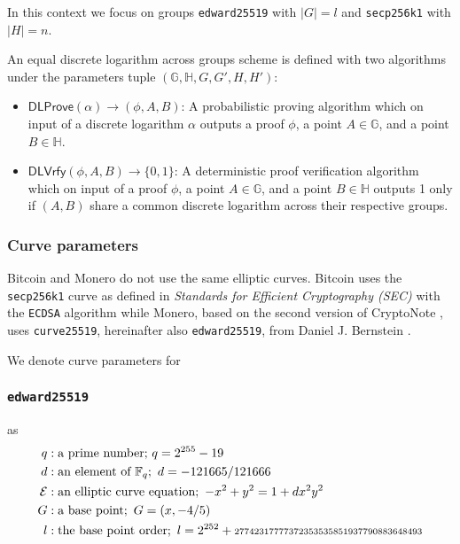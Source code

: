 \documentclass{llncs}
\newcommand{\DLProve}{\textsf{DLProve}}
\newcommand{\DLVrfy}{\textsf{DLVrfy}}
\newcommand{\GG}{\mathbb{G}}
\newcommand{\HH}{\mathbb{H}}
\begin{document}
In this context we focus on groups \texttt{edward25519} with $|G| = l$ and \texttt{secp256k1} with $|H| = n$.

\begin{definition}
    An equal discrete logarithm across groups scheme is defined with two algorithms under the parameters tuple $(\GG,\HH,G,G',H,H')$:
\begin{itemize}
    \item $\DLProve(\alpha) \rightarrow (\phi,A,B)$: A probabilistic proving algorithm which on input of a discrete logarithm $\alpha$ outputs a proof $\phi$, a point $A \in \GG$, and a point $B \in \HH$.
    \item $\DLVrfy(\phi,A,B) \rightarrow \{0,1\}$: A deterministic proof verification algorithm which on input of a proof $\phi$, a point $A \in \GG$, and a point $B \in \HH$ outputs 1 only if $(A,B)$ share a common discrete logarithm across their respective groups.
\end{itemize}
\end{definition}

\subsubsection{Curve parameters}
\label{curveParams}
Bitcoin and Monero do not use the same elliptic curves. Bitcoin uses the \texttt{secp256k1} curve as defined in \textit{Standards for Efficient Cryptography (SEC)} with the \texttt{ECDSA} algorithm while Monero, based on the second version of CryptoNote \cite{van2013cryptonote}, uses \texttt{curve25519}, hereinafter also \texttt{edward25519}, from Daniel J. Bernstein \cite{CerRes10}.

We denote curve parameters for

\subsubsection{\texttt{edward25519}} as
\begin{equation}
\begin{split}
    q&: \text{a prime number;}\ q = 2^{255} - 19 \\
    d&: \text{an element of } \mathbb{F}_q;\ d = - 121665/121666 \\
    \mathcal{E}&: \text{an elliptic curve equation};\ -x^2 + y^2 = 1 + dx^2y^2 \\
    G&: \text{a base point};\ G = (x, -4/5) \\
    l&: \text{the base point order};\ l = 2^{252} + \text{\scriptsize27742317777372353535851937790883648493} \\
\end{split}
\end{equation}
\end{document}
